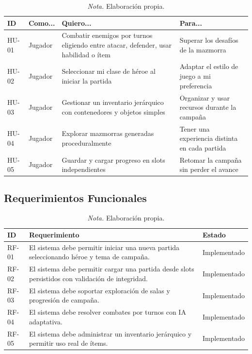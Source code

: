 \documentclass[stu,12pt,floatsintext]{apa7}
\begin{document}
\begin{table}[H]
\centering
\caption{Historias de usuario del sistema Eranthia}
\begin{tabular}{p{1.5cm}p{2cm}p{5cm}p{5cm}}
\toprule
\textbf{ID} & \textbf{Como...} & \textbf{Quiero...} & \textbf{Para...} \\
\midrule
HU-01 & Jugador & Combatir enemigos por turnos eligiendo entre atacar, defender, usar habilidad o ítem & Superar los desafíos de la mazmorra \\

HU-02 & Jugador & Seleccionar mi clase de héroe al iniciar la partida & Adaptar el estilo de juego a mi preferencia \\

HU-03 & Jugador & Gestionar un inventario jerárquico con contenedores y objetos simples & Organizar y usar recursos durante la campaña \\

HU-04 & Jugador & Explorar mazmorras generadas proceduralmente & Tener una experiencia distinta en cada partida \\

HU-05 & Jugador & Guardar y cargar progreso en slots independientes & Retomar la campaña sin perder el avance \\
\bottomrule
\end{tabular}
\caption*{\textit{Nota.} Elaboración propia.}
\end{table}


\subsection{Requerimientos Funcionales}

\begin{table}[H]
\centering
\caption{Requerimientos funcionales del sistema}
\begin{tabular}{p{2cm}p{9cm}p{3cm}}
\toprule
\textbf{ID} & \textbf{Requerimiento} & \textbf{Estado} \\
\midrule
RF-01 & El sistema debe permitir iniciar una nueva partida seleccionando héroe y tema de campaña. & Implementado \\

RF-02 & El sistema debe permitir cargar una partida desde slots persistidos con validación de integridad. & Implementado \\

RF-03 & El sistema debe soportar exploración de salas y progresión de campaña. & Implementado \\

RF-04 & El sistema debe resolver combates por turnos con IA adaptativa. & Implementado \\

RF-05 & El sistema debe administrar un inventario jerárquico y permitir uso real de ítems. & Implementado \\
\bottomrule
\end{tabular}
\caption*{\textit{Nota.} Elaboración propia.}
\end{table}
\end{document}
